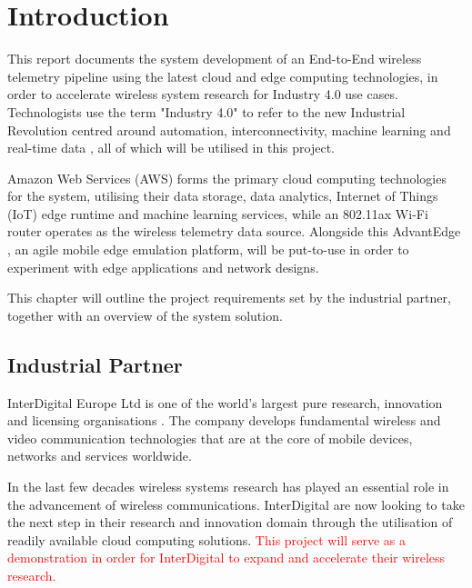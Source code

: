 \chapter{Introduction} \label{Chapter:Introduction}

This report documents the system development of an End-to-End wireless telemetry pipeline using the latest cloud and edge computing technologies, in order to accelerate wireless system research for Industry 4.0 use cases. Technologists use the term "Industry 4.0" to refer to the new Industrial Revolution centred around automation, interconnectivity, machine learning and real-time data \cite{industry4.0}, all of which will be utilised in this project. 

\noindent Amazon Web Services (AWS) forms the primary cloud computing technologies for the system, utilising their data storage, data analytics, Internet of Things (IoT) edge runtime and machine learning services, while an 802.11ax Wi-Fi router operates as the wireless telemetry data source. Alongside this AdvantEdge \cite{AdvantEdge}, an agile mobile edge emulation platform, will be put-to-use in order to experiment with edge applications and network designs.

\noindent This chapter will outline the project requirements set by the industrial partner, together with an overview of the system solution.  

\section{Industrial Partner}

InterDigital Europe Ltd is one of the world's largest pure research, innovation and licensing organisations \cite{interdigitalAbout}. The company develops fundamental wireless and video communication technologies that are at the core of mobile devices, networks and services worldwide. 

\noindent In the last few decades wireless systems research has played an essential role in the advancement of wireless communications. InterDigital are now looking to take the next step in their research and innovation domain through the utilisation of readily available cloud computing solutions. \textcolor{red}{This project will serve as a demonstration in order for InterDigital to expand and accelerate their wireless research. }

